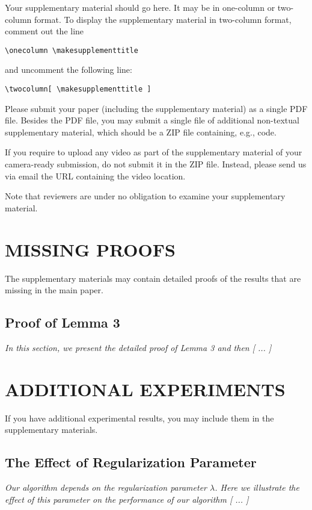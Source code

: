 Your supplementary material should go here. It may be in one-column or two-column format. To display the supplementary material in two-column format, comment out the line
\begin{verbatim}
\onecolumn \makesupplementtitle
\end{verbatim}
and uncomment the following line:
\begin{verbatim}
\twocolumn[ \makesupplementtitle ]
\end{verbatim}

Please submit your paper (including the supplementary material) as a single PDF file. Besides the PDF file, you may submit a single file of additional non-textual supplementary material, which should be a ZIP file containing, e.g., code.

If you require to upload any video as part of the supplementary material of your camera-ready submission, do not submit it in the ZIP file. Instead, please send us via email the URL containing the video location.

Note that reviewers are under no obligation to examine your supplementary material.

\section{MISSING PROOFS}

The supplementary materials may contain detailed proofs of the results that are missing in the main paper.

\subsection{Proof of Lemma 3}

\textit{In this section, we present the detailed proof of Lemma 3 and then [ ... ]}

\section{ADDITIONAL EXPERIMENTS}

If you have additional experimental results, you may include them in the supplementary materials.

\subsection{The Effect of Regularization Parameter}

\textit{Our algorithm depends on the regularization parameter $\lambda$. Here we illustrate the effect of this parameter on the performance of our algorithm [ ... ]}


